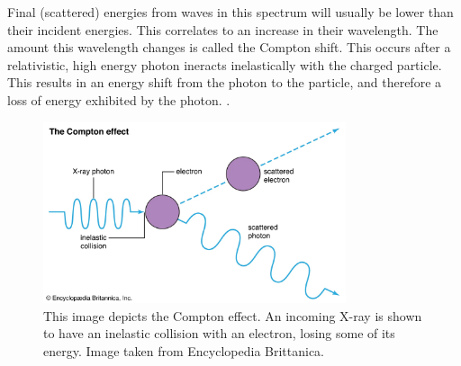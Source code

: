 \documentclass[10pt,letterpaper,onecolumn]{article}
\begin{document}
Final (scattered) energies from waves in this spectrum will usually be lower than their incident energies. This correlates to an increase in their wavelength. The amount this wavelength changes is called the Compton shift. This occurs after a relativistic, high energy photon ineracts inelastically with the charged particle. This results in an energy shift from the photon to the particle, and therefore a loss of energy exhibited by the photon.\cite{Pattison1975} \cite{ComptonEffectImage}.
\begin{figure}
    \begin{center}
        \includegraphics*[width=3.5in]{scattering.jpg}
        \caption{This image depicts the Compton effect. An incoming X-ray is shown to have an inelastic collision with an electron, losing some of its energy. Image taken from Encyclopedia Brittanica.}
    \end{center}
\end{figure}
\end{document}
